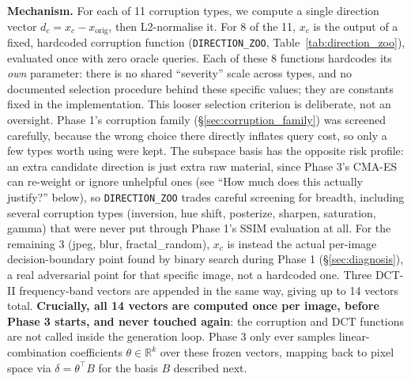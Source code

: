 \documentclass[11pt, a4paper]{article}
\begin{document}
\textbf{Mechanism.} For each of 11 corruption types, we compute a single direction vector $d_c = x_c - x_{\mathrm{orig}}$, then L2-normalise it. For 8 of the 11, $x_c$ is the output of a fixed, hardcoded corruption function (\texttt{DIRECTION\_ZOO}, Table~\ref{tab:direction_zoo}), evaluated once with zero oracle queries. Each of these 8 functions hardcodes its \emph{own} parameter: there is no shared ``severity'' scale across types, and no documented selection procedure behind these specific values; they are constants fixed in the implementation. This looser selection criterion is deliberate, not an oversight. Phase 1's corruption family (\S\ref{sec:corruption_family}) was screened carefully, because the wrong choice there directly inflates query cost, so only a few types worth using were kept. The subspace basis has the opposite risk profile: an extra candidate direction is just extra raw material, since Phase 3's CMA-ES can re-weight or ignore unhelpful ones (see ``How much does this actually justify?'' below), so \texttt{DIRECTION\_ZOO} trades careful screening for breadth, including several corruption types (inversion, hue shift, posterize, sharpen, saturation, gamma) that were never put through Phase 1's SSIM evaluation at all. For the remaining 3 (jpeg, blur, fractal\_random), $x_c$ is instead the actual per-image decision-boundary point found by binary search during Phase 1 (\S\ref{sec:diagnosis}), a real adversarial point for that specific image, not a hardcoded one. Three DCT-II frequency-band vectors are appended in the same way, giving up to 14 vectors total. \textbf{Crucially, all 14 vectors are computed once per image, before Phase 3 starts, and never touched again}: the corruption and DCT functions are not called inside the generation loop. Phase 3 only ever samples linear-combination coefficients $\theta\in\mathbb{R}^k$ over these frozen vectors, mapping back to pixel space via $\delta = \theta^\top B$ for the basis $B$ described next.
\end{document}
